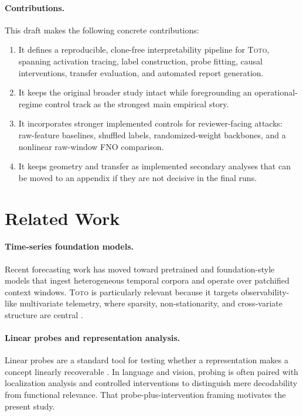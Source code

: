 \documentclass{article}
\newcommand{\model}{\textsc{Toto}}
\begin{document}
\paragraph{Contributions.}
This draft makes the following concrete contributions:
\begin{enumerate}[leftmargin=18pt]
\item It defines a reproducible, clone-free interpretability pipeline for \model{}, spanning activation tracing, label construction, probe fitting, causal interventions, transfer evaluation, and automated report generation.
\item It keeps the original broader study intact while foregrounding an operational-regime control track as the strongest main empirical story.
\item It incorporates stronger implemented controls for reviewer-facing attacks: raw-feature baselines, shuffled labels, randomized-weight backbones, and a nonlinear raw-window FNO comparison.
\item It keeps geometry and transfer as implemented secondary analyses that can be moved to an appendix if they are not decisive in the final runs.
\end{enumerate}

\section{Related Work}

\paragraph{Time-series foundation models.}
Recent forecasting work has moved toward pretrained and foundation-style models that ingest heterogeneous temporal corpora and operate over patchified context windows. \model{} is particularly relevant because it targets observability-like multivariate telemetry, where sparsity, non-stationarity, and cross-variate structure are central \citep{datadog2025toto}.

\paragraph{Linear probes and representation analysis.}
Linear probes are a standard tool for testing whether a representation makes a concept linearly recoverable \citep{alain2016understanding}. In language and vision, probing is often paired with localization analysis and controlled interventions to distinguish mere decodability from functional relevance. That probe-plus-intervention framing motivates the present study.
\end{document}
